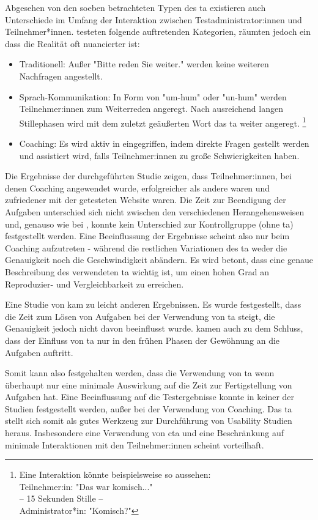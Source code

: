 Abgesehen von den soeben betrachteten Typen des \acl{ta} existieren auch Unterschiede im Umfang der
Interaktion zwischen Testadministrator:innen und Teilnehmer*innen.
\textcite{olmsted-hawalaThinkaloudProtocols2010} testeten folgende auftretenden Kategorien, räumten
jedoch ein dass die Realität oft nuancierter ist:
\begin{itemize}
  \item Traditionell: Außer "Bitte reden Sie weiter." werden keine weiteren Nachfragen angestellt.
  \item Sprach-Kommunikation: In Form von "um-hum" oder "un-hum" werden Teilnehmer:innen zum
    Weiterreden angeregt. Nach ausreichend langen Stillephasen wird mit dem zuletzt geäußerten Wort
    das \acl{ta} weiter angeregt. \footnote{Eine Interaktion könnte beispielsweise so aussehen:\\
    Teilnehmer:in: "Das war komisch..." \\ -- 15 Sekunden Stille -- \\ Administrator*in: "Komisch?"}
  \item Coaching: Es wird aktiv in eingegriffen, indem direkte Fragen gestellt werden und assistiert
    wird, falls Teilnehmer:innen zu große Schwierigkeiten haben.
\end{itemize}
Die Ergebnisse der \citeyear{olmsted-hawalaThinkaloudProtocols2010} durchgeführten Studie zeigen,
dass Teilnehmer:innen, bei denen Coaching angewendet wurde, erfolgreicher als andere waren und
zufriedener mit der getesteten Website waren. Die Zeit zur Beendigung der Aufgaben unterschied sich
nicht zwischen den verschiedenen Herangehensweisen und, genauso wie bei
\citeauthor{alhadretiRethinkingThinking2018}, konnte kein Unterschied zur Kontrollgruppe (ohne
\ac{ta}) festgestellt werden. Eine Beeinflussung der Ergebnisse scheint also nur beim Coaching
aufzutreten - während die restlichen Variationen des \ac{ta} weder die Genauigkeit noch die
Geschwindigkeit abändern. Es wird betont, dass eine genaue Beschreibung des verwendeten \acl{ta}
wichtig ist, um einen hohen Grad an Reproduzier- und Vergleichbarkeit zu erreichen.

Eine Studie von \textcite{rheniusEvaluationConcurrent1990} kam zu leicht anderen Ergebnissen. Es
wurde festgestellt, dass die Zeit zum Lösen von Aufgaben bei der Verwendung von \ac{ta} steigt, die
Genauigkeit jedoch nicht davon beeinflusst wurde. \citeauthor{rheniusEvaluationConcurrent1990} kamen
auch zu dem Schluss, dass der Einfluss von \ac{ta} nur in den frühen Phasen der Gewöhnung an die
Aufgaben auftritt.
\parencite{rheniusEvaluationConcurrent1990}

Somit kann also festgehalten werden, dass die Verwendung von \ac{ta} wenn überhaupt nur eine
minimale Auswirkung auf die Zeit zur Fertigstellung von Aufgaben hat. Eine Beeinflussung auf die
Testergebnisse konnte in keiner der Studien festgestellt werden, außer bei der Verwendung von
Coaching. Das \acl{ta} stellt sich somit als gutes Werkzeug zur Durchführung von Usability Studien
heraus. Insbesondere eine Verwendung von \acl{cta} und eine Beschränkung auf minimale Interaktionen
mit den Teilnehmer:innen scheint vorteilhaft.
